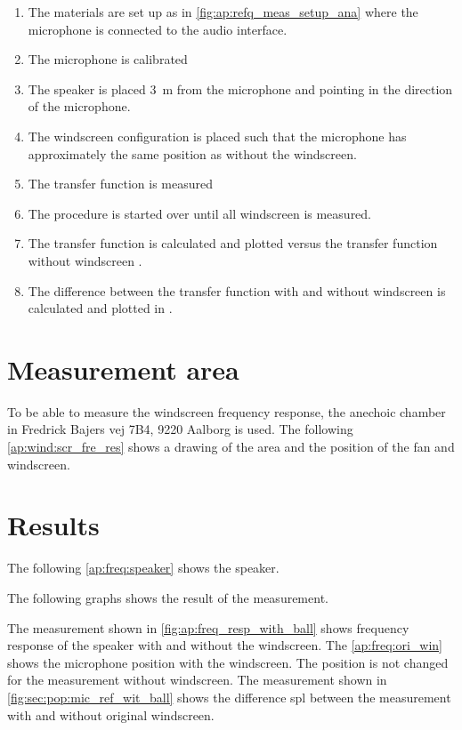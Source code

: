 \begin{enumerate}
\item The materials are set up as in \autoref{fig:ap:refq_meas_setup_ana} where the  microphone is connected to the audio interface.
\item The microphone is calibrated
\item The speaker is placed \SI{3}{\meter} from the microphone and pointing in the direction of the microphone.
\item    The windscreen configuration is placed such that the microphone has approximately the same position as without the windscreen.
\item The transfer function is measured 
\item The procedure is started over until all windscreen is measured.
\item The transfer function is calculated and plotted versus the transfer function without windscreen \matlab.
\item The difference between the transfer function with and without windscreen is calculated and plotted in \matlab.
\end{enumerate}


\section*{Measurement area}
To be able to measure the windscreen frequency response, the anechoic chamber in Fredrick Bajers vej 7B4, 9220 Aalborg is used. The following \autoref{ap:wind:scr_fre_res} shows a drawing of the area and the position of the fan and windscreen.

\section*{Results}

The following \autoref{ap:freq:speaker} shows the speaker.


The following graphs shows the result of the measurement. 

The measurement shown in \autoref{fig:ap:freq_resp_with_ball} shows frequency response of the speaker with and without the windscreen. The \autoref{ap:freq:ori_win} shows the microphone position with the windscreen. The position is not changed for the measurement without windscreen. 
The measurement shown in \autoref{fig:sec:pop:mic_ref_wit_ball} shows the difference \gls{spl} between the measurement with and without original windscreen. 


